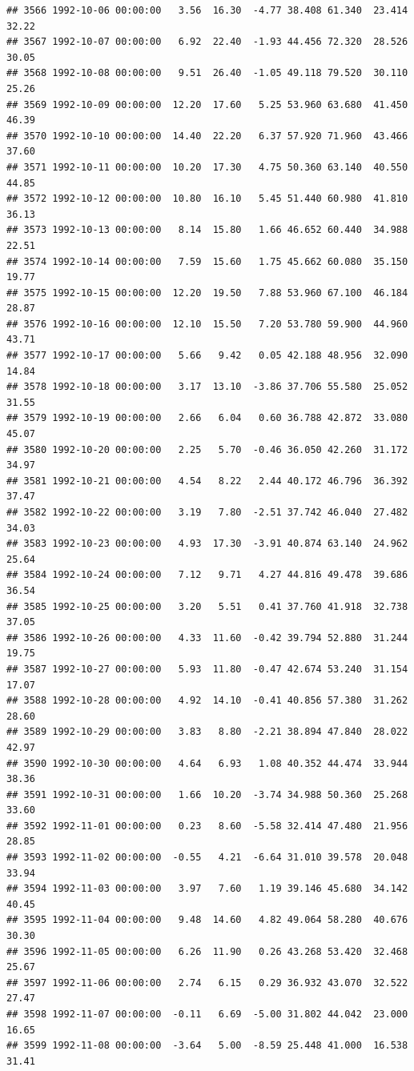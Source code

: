 \documentclass{article}\usepackage{graphicx, color}
\makeatletter
\newenvironment{kframe}{%
 \def\at@end@of@kframe{}%
 \ifinner\ifhmode%
  \def\at@end@of@kframe{\end{minipage}}%
  \begin{minipage}{\columnwidth}%
 \fi\fi%
 \def\FrameCommand##1{\hskip\@totalleftmargin \hskip-\fboxsep
 \colorbox{shadecolor}{##1}\hskip-\fboxsep
     \hskip-\linewidth \hskip-\@totalleftmargin \hskip\columnwidth}%
 \MakeFramed {\advance\hsize-\width
   \@totalleftmargin\z@ \linewidth\hsize
   \@setminipage}}%
 {\par\unskip\endMakeFramed%
 \at@end@of@kframe}
\newenvironment{knitrout}{}{} %
\makeatother
\begin{document}
\begin{knitrout}
\begin{kframe}
\begin{verbatim}
## 3566 1992-10-06 00:00:00   3.56  16.30  -4.77 38.408 61.340  23.414  32.22
## 3567 1992-10-07 00:00:00   6.92  22.40  -1.93 44.456 72.320  28.526  30.05
## 3568 1992-10-08 00:00:00   9.51  26.40  -1.05 49.118 79.520  30.110  25.26
## 3569 1992-10-09 00:00:00  12.20  17.60   5.25 53.960 63.680  41.450  46.39
## 3570 1992-10-10 00:00:00  14.40  22.20   6.37 57.920 71.960  43.466  37.60
## 3571 1992-10-11 00:00:00  10.20  17.30   4.75 50.360 63.140  40.550  44.85
## 3572 1992-10-12 00:00:00  10.80  16.10   5.45 51.440 60.980  41.810  36.13
## 3573 1992-10-13 00:00:00   8.14  15.80   1.66 46.652 60.440  34.988  22.51
## 3574 1992-10-14 00:00:00   7.59  15.60   1.75 45.662 60.080  35.150  19.77
## 3575 1992-10-15 00:00:00  12.20  19.50   7.88 53.960 67.100  46.184  28.87
## 3576 1992-10-16 00:00:00  12.10  15.50   7.20 53.780 59.900  44.960  43.71
## 3577 1992-10-17 00:00:00   5.66   9.42   0.05 42.188 48.956  32.090  14.84
## 3578 1992-10-18 00:00:00   3.17  13.10  -3.86 37.706 55.580  25.052  31.55
## 3579 1992-10-19 00:00:00   2.66   6.04   0.60 36.788 42.872  33.080  45.07
## 3580 1992-10-20 00:00:00   2.25   5.70  -0.46 36.050 42.260  31.172  34.97
## 3581 1992-10-21 00:00:00   4.54   8.22   2.44 40.172 46.796  36.392  37.47
## 3582 1992-10-22 00:00:00   3.19   7.80  -2.51 37.742 46.040  27.482  34.03
## 3583 1992-10-23 00:00:00   4.93  17.30  -3.91 40.874 63.140  24.962  25.64
## 3584 1992-10-24 00:00:00   7.12   9.71   4.27 44.816 49.478  39.686  36.54
## 3585 1992-10-25 00:00:00   3.20   5.51   0.41 37.760 41.918  32.738  37.05
## 3586 1992-10-26 00:00:00   4.33  11.60  -0.42 39.794 52.880  31.244  19.75
## 3587 1992-10-27 00:00:00   5.93  11.80  -0.47 42.674 53.240  31.154  17.07
## 3588 1992-10-28 00:00:00   4.92  14.10  -0.41 40.856 57.380  31.262  28.60
## 3589 1992-10-29 00:00:00   3.83   8.80  -2.21 38.894 47.840  28.022  42.97
## 3590 1992-10-30 00:00:00   4.64   6.93   1.08 40.352 44.474  33.944  38.36
## 3591 1992-10-31 00:00:00   1.66  10.20  -3.74 34.988 50.360  25.268  33.60
## 3592 1992-11-01 00:00:00   0.23   8.60  -5.58 32.414 47.480  21.956  28.85
## 3593 1992-11-02 00:00:00  -0.55   4.21  -6.64 31.010 39.578  20.048  33.94
## 3594 1992-11-03 00:00:00   3.97   7.60   1.19 39.146 45.680  34.142  40.45
## 3595 1992-11-04 00:00:00   9.48  14.60   4.82 49.064 58.280  40.676  30.30
## 3596 1992-11-05 00:00:00   6.26  11.90   0.26 43.268 53.420  32.468  25.67
## 3597 1992-11-06 00:00:00   2.74   6.15   0.29 36.932 43.070  32.522  27.47
## 3598 1992-11-07 00:00:00  -0.11   6.69  -5.00 31.802 44.042  23.000  16.65
## 3599 1992-11-08 00:00:00  -3.64   5.00  -8.59 25.448 41.000  16.538  31.41

\end{verbatim}
\end{kframe}
\end{knitrout}
\end{document}

